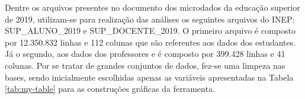 \documentclass[12pt]{article}
\begin{document}
Dentre os arquivos presentes no documento dos microdados da educação superior de 2019, utilizam-se para realização das análises os seguintes arquivos do INEP: SUP\_ALUNO\_2019 e SUP\_DOCENTE\_2019. O primeiro arquivo é composto por 12.350.832 linhas e 112 colunas que são referentes aos dados dos estudantes. Já o segundo, aos dados dos professores e é composto por 399.428 linhas e 41 colunas. Por se tratar de grandes conjuntos de dados, fez-se uma limpeza nas bases, sendo inicialmente escolhidas apenas as variáveis apresentadas na Tabela  \ref{tab:my-table} para as construções gráficas da ferramenta.


\begin{table}[H]
\centering
\caption{Variáveis utilizadas nas análises com a base de dados do INEP}
\label{tab:my-table}
\end{table}
\end{document}
